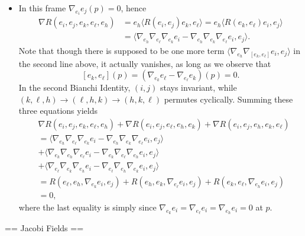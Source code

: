 \begin{itemize}
    \item[7.] In this frame $\nabla_{e_i}e_j(p)=0$, hence
    \begin{align*}
        \nabla R(e_i,e_j,e_k,e_\ell,e_h)
        &=e_h\langle R(e_i,e_j)e_k,e_\ell\rangle
        =e_h\langle R(e_k,e_\ell)e_i,e_j\rangle\\
        &=\langle\nabla_{e_h}\nabla_{e_\ell}\nabla_{e_k}e_i
        -\nabla_{e_h}\nabla_{e_k}\nabla_{e_\ell}e_i,e_j\rangle.
    \end{align*}
    Note that though there is supposed to be one more term 
    $\langle\nabla_{e_h}\nabla_{[e_k,e_\ell]}e_i,e_j\rangle$ 
    in the second line above, it actually vanishes, as long as we observe that
    \[[e_k,e_\ell](p)=(\nabla_{e_k}e_\ell-\nabla_{e_\ell}e_k)(p)=0.\]
    In the second Bianchi Identity, $(i,j)$ stays invariant, 
    while $(k,\ell,h)\to(\ell,h,k)\to(h,k,\ell)$ permutes cyclically. 
    Summing these three equations yields
    \begin{align*}
        &\nabla R(e_i,e_j,e_k,e_\ell,e_h)+\nabla R(e_i,e_j,e_\ell,e_h,e_k)
        +\nabla R(e_i,e_j,e_h,e_k,e_\ell)\\
        &=\langle\nabla_{e_h}\nabla_{e_\ell}\nabla_{e_k}e_i
        -\nabla_{e_h}\nabla_{e_k}\nabla_{e_\ell}e_i,e_j\rangle\\
        &+\langle\nabla_{e_k}\nabla_{e_h}\nabla_{e_\ell}e_i
        -\nabla_{e_k}\nabla_{e_\ell}\nabla_{e_h}e_i,e_j\rangle\\
        &+\langle\nabla_{e_\ell}\nabla_{e_k}\nabla_{e_h}e_i
        -\nabla_{e_\ell}\nabla_{e_h}\nabla_{e_k}e_i,e_j\rangle\\
        &=R(e_\ell,e_h,\nabla_{e_k}e_i,e_j)
        +R(e_h,e_k,\nabla_{e_\ell}e_i,e_j)
        +R(e_k,e_\ell,\nabla_{e_h}e_i,e_j)\\
        &=0,
    \end{align*}
    where the last equality is simply since 
    $\nabla_{e_k}e_i=\nabla_{e_\ell}e_i=\nabla_{e_h}e_i=0$ at $p$.
\end{itemize}

== Jacobi Fields ==

